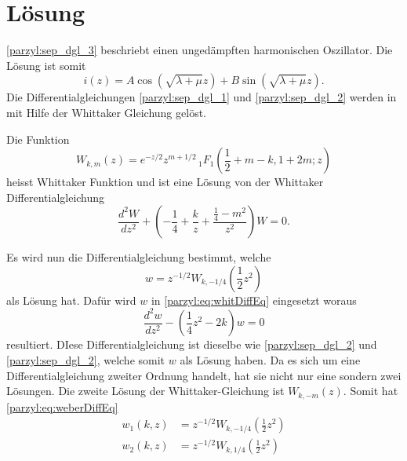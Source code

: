 %
%
%
\section{Lösung
\label{parzyl:section:teil1}}

\eqref{parzyl:sep_dgl_3} beschriebt einen ungedämpften harmonischen Oszillator.
Die Lösung ist somit
\begin{equation}
	i(z) 
	= 
	A\cos{ 
		\left ( 
		\sqrt{\lambda + \mu}z
		\right )}
	+
	B\sin{ 
		\left ( 
		\sqrt{\lambda + \mu}z
		\right )}.
\end{equation}
Die Differentialgleichungen \eqref{parzyl:sep_dgl_1} und \eqref{parzyl:sep_dgl_2} werden in \cite{parzyl:whittaker}
mit Hilfe der Whittaker Gleichung gelöst.
\begin{definition}
    Die Funktion 
    \begin{equation*}
        W_{k,m}(z) = 
    e^{-z/2} z^{m+1/2} \,
    {}_{1} F_{1}
    (
        {\textstyle \frac{1}{2}} 
        + m - k, 1 + 2m; z)
    \end{equation*}
    heisst Whittaker Funktion und ist eine Lösung
    von der Whittaker Differentialgleichung
    \begin{equation}
        \frac{d^2W}{d z^2} +
        \left(-\frac{1}{4}  + \frac{k}{z} + \frac{\frac{1}{4} - m^2}{z^2} \right) W = 0.
        \label{parzyl:eq:whitDiffEq}
    \end{equation}
\end{definition}
Es wird nun die Differentialgleichung bestimmt, welche
\begin{equation}
    w = z^{-1/2} W_{k,-1/4} \left({\textstyle \frac{1}{2}} z^2\right)
\end{equation}
als Lösung hat.
Dafür wird $w$ in \eqref{parzyl:eq:whitDiffEq} eingesetzt woraus
\begin{equation}
    \frac{d^2 w}{dz^2} - \left(\frac{1}{4} z^2 - 2k\right) w = 0
\label{parzyl:eq:weberDiffEq}
\end{equation}
resultiert. DIese Differentialgleichung ist dieselbe wie 
\eqref{parzyl:sep_dgl_2} und \eqref{parzyl:sep_dgl_2}, welche somit
$w$ als Lösung haben.
Da es sich um eine Differentialgleichung zweiter Ordnung handelt, hat sie nicht nur
eine sondern zwei Lösungen.
Die zweite Lösung der Whittaker-Gleichung ist $W_{k,-m} (z)$.
Somit hat \eqref{parzyl:eq:weberDiffEq}
\begin{align}
    w_1(k, z) & = z^{-1/2} W_{k,-1/4} \left({\textstyle \frac{1}{2}} z^2\right)\\
    w_2(k, z) & = z^{-1/2} W_{k,1/4} \left({\textstyle \frac{1}{2}} z^2\right)
\end{align}
